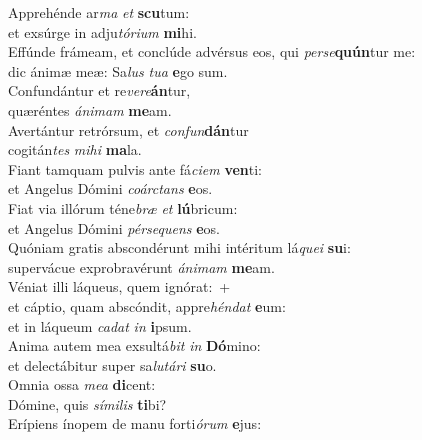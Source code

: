 \evenverse Apprehénde ar\textit{ma} \textit{et} \textbf{scu}tum:~\*\\
\evenverse et exsúrge in adju\textit{tó}\textit{ri}\textit{um} \textbf{mi}hi.\\
\oddverse Effúnde frámeam, et conclúde advérsus eos, qui \textit{per}\textit{se}\textbf{quún}tur me:~\*\\
\oddverse dic ánimæ meæ: Sa\textit{lus} \textit{tu}\textit{a} \textbf{e}go sum.\\
\evenverse Confundántur et re\textit{ve}\textit{re}\textbf{án}tur,~\*\\
\evenverse quæréntes \textit{á}\textit{ni}\textit{mam} \textbf{me}am.\\
\oddverse Avertántur retrórsum, et \textit{con}\textit{fun}\textbf{dán}tur~\*\\
\oddverse cogitán\textit{tes} \textit{mi}\textit{hi} \textbf{ma}la.\\
\evenverse Fiant tamquam pulvis ante fá\textit{ci}\textit{em} \textbf{ven}ti:~\*\\
\evenverse et Angelus Dómini \textit{co}\textit{ár}\textit{ctans} \textbf{e}os.\\
\oddverse Fiat via illórum téne\textit{bræ} \textit{et} \textbf{lú}bricum:~\*\\
\oddverse et Angelus Dómini \textit{pér}\textit{se}\textit{quens} \textbf{e}os.\\
\evenverse Quóniam gratis abscondérunt mihi intéritum lá\textit{que}\textit{i} \textbf{su}i:~\*\\
\evenverse supervácue exprobravérunt \textit{á}\textit{ni}\textit{mam} \textbf{me}am.\\
\oddverse Véniat illi láqueus, quem ignórat:~+\\
\oddverse  et cáptio, quam abscóndit, appre\textit{hén}\textit{dat} \textbf{e}um:~\*\\
\oddverse et in láqueum \textit{ca}\textit{dat} \textit{in} \textbf{i}psum.\\
\evenverse Anima autem mea exsultá\textit{bit} \textit{in} \textbf{Dó}mino:~\*\\
\evenverse et delectábitur super sa\textit{lu}\textit{tá}\textit{ri} \textbf{su}o.\\
\oddverse Omnia ossa \textit{me}\textit{a} \textbf{di}cent:~\*\\
\oddverse Dómine, quis \textit{sí}\textit{mi}\textit{lis} \textbf{ti}bi?\\
\evenverse Erípiens ínopem de manu forti\textit{ó}\textit{rum} \textbf{e}jus:~\*\\
